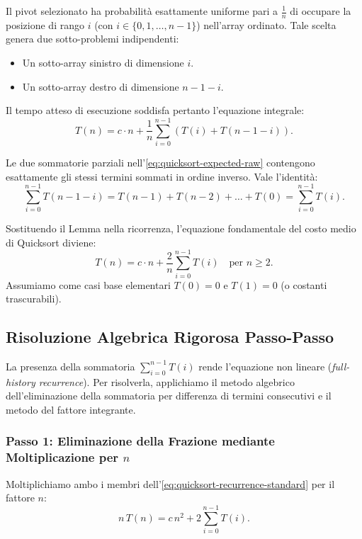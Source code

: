 Il pivot selezionato ha probabilità esattamente uniforme pari a $\frac{1}{n}$ di occupare la posizione di rango $i$ (con $i \in \{0, 1, \dots, n - 1\}$) nell'array ordinato. Tale scelta genera due sotto-problemi indipendenti:
\begin{itemize}
  \item Un sotto-array sinistro di dimensione $i$.
  \item Un sotto-array destro di dimensione $n - 1 - i$.
\end{itemize}

Il tempo atteso di esecuzione soddisfa pertanto l'equazione integrale:
\begin{equation}
  T(n) = c \cdot n + \frac{1}{n} \sum_{i=0}^{n-1} \left( T(i) + T(n - 1 - i) \right).
  \label{eq:quicksort-expected-raw}
\end{equation}

\begin{lemma}
Le due sommatorie parziali nell'\autoref{eq:quicksort-expected-raw} contengono esattamente gli stessi termini sommati in ordine inverso. Vale l'identità:
\begin{equation}
  \sum_{i=0}^{n-1} T(n - 1 - i) = T(n-1) + T(n-2) + \dots + T(0) = \sum_{i=0}^{n-1} T(i).
\end{equation}
\end{lemma}

Sostituendo il Lemma nella ricorrenza, l'equazione fondamentale del costo medio di Quicksort diviene:
\begin{equation}
  T(n) = c \cdot n + \frac{2}{n} \sum_{i=0}^{n-1} T(i) \quad \text{per } n \ge 2.
  \label{eq:quicksort-recurrence-standard}
\end{equation}
Assumiamo come casi base elementari $T(0) = 0$ e $T(1) = 0$ (o costanti trascurabili).

\subsection{Risoluzione Algebrica Rigorosa Passo-Passo}
\label{subsec:quicksort-step-by-step-solution}

La presenza della sommatoria $\sum_{i=0}^{n-1} T(i)$ rende l'equazione non lineare (\textit{full-history recurrence}). Per risolverla, applichiamo il metodo algebrico dell'eliminazione della sommatoria per differenza di termini consecutivi e il metodo del fattore integrante.

\subsubsection{Passo 1: Eliminazione della Frazione mediante Moltiplicazione per $n$}
Moltiplichiamo ambo i membri dell'\autoref{eq:quicksort-recurrence-standard} per il fattore $n$:
\begin{equation}
  n \, T(n) = c \, n^2 + 2 \sum_{i=0}^{n-1} T(i).
  \label{eq:quicksort-step1}
\end{equation}


